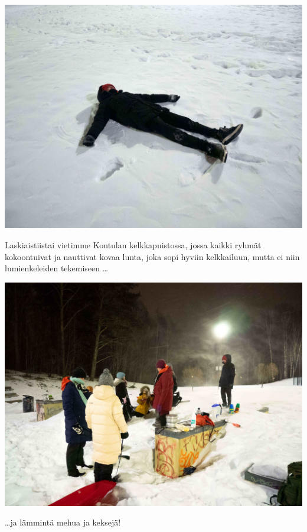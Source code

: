 \documentclass[10pt,finnish,a5paper,twoside=semi]{scrartcl}
\begin{document}
\begin{multicols}{2}

	\vspace*{0.16cm}
	\noindent\includegraphics[width=\linewidth]{assets/laskiaistiistai2}

	\small Laskiaistiistai vietimme Kontulan \mbox{kelkkapuistossa}, jossa kaikki
	ryhmät kokoontuivat ja nauttivat kovaa lunta, joka sopi hyviin kelkkailuun, mutta ei niin
	lumienkeleiden tekemiseen \ldots

	\vspace*{1.28cm}
	\noindent\includegraphics[width=\linewidth]{assets/laskiaistiistai1}

	\ldots ja lämmintä mehua ja keksejä!
	\columnbreak


\end{multicols}
\end{document}
